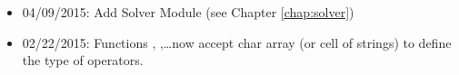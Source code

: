 \begin{itemize}
\item 04/09/2015: Add Solver Module (see Chapter \ref{chap:solver})
\item 02/22/2015: Functions \IntegralOperator, \BlockIntegralOperator,\ldots now accept char array (or cell of strings) to define the type of operators.
\end{itemize}